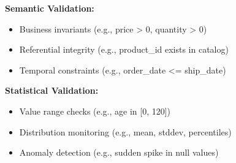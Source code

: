 \textbf{Semantic Validation:}
\begin{itemize}
    \item Business invariants (e.g., price > 0, quantity > 0)
    \item Referential integrity (e.g., product\_id exists in catalog)
    \item Temporal constraints (e.g., order\_date <= ship\_date)
\end{itemize}

\textbf{Statistical Validation:}
\begin{itemize}
    \item Value range checks (e.g., age in [0, 120])
    \item Distribution monitoring (e.g., mean, stddev, percentiles)
    \item Anomaly detection (e.g., sudden spike in null values)
\end{itemize}

